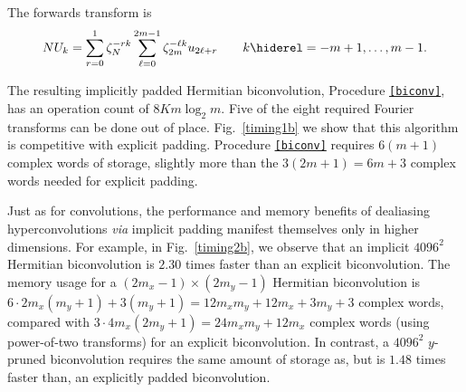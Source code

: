 \documentclass[final]{siamltex}
\def\be{\begin{dmath*}}
\def\ee{\end{dmath*}}
\def\no{\hiderel}
\begin{document}
The forwards transform is
\be
NU_k=\sum_{r=0}^{1}\zeta_N^{-rk}
\sum_{\ell=0}^{2m-1} \zeta_{2m}^{-\ell k} u_{2\ell+r}
\qquad k\no =-m+1,\ldots,m-1.
\ee

The resulting implicitly padded Hermitian biconvolution,
Procedure {\tt\ref{biconv}}, has an operation count of $8Km\log_2 m$. 
Five of the eight required Fourier transforms can be done out of place.
Fig.~\ref{timing1b} we show that this algorithm is competitive with
explicit padding. Procedure {\tt\ref{biconv}} requires $6(m+1)$ complex words of
storage, slightly more than the $3(2m+1)=6m+3$ complex words needed for explicit
padding.

Just as for convolutions, the performance and memory benefits of
dealiasing hyperconvolutions {\it via\/} implicit padding manifest themselves only in
higher dimensions. For example, in Fig.~\ref{timing2b}, we observe 
that an implicit $4096^2$ Hermitian biconvolution is $2.30$ times
faster than an explicit biconvolution.
The memory usage for a $(2m_x-1)\times (2m_y-1)$ Hermitian biconvolution
is $6\cdot 2m_x(m_y+1)+3(m_y+1)=12m_xm_y+12m_x+3m_y+3$ complex words,
compared with $3\cdot 4m_x(2m_y+1)=24m_xm_y+12m_x$ complex words
(using power-of-two transforms) for an explicit biconvolution. In contrast, a
$4096^2$ $y$-pruned biconvolution requires the same amount of storage as, but
is $1.48$ times faster than, an explicitly padded biconvolution.
\end{document}
